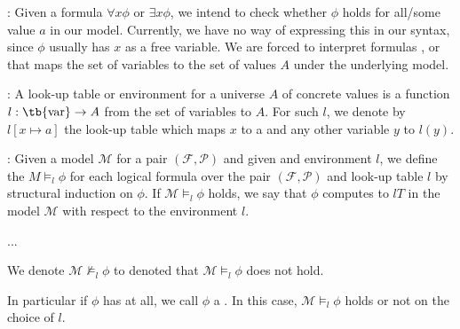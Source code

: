     \par {}: Given a formula $\forall x \phi$ or $\exists x \phi$, we intend to check whether $\phi$ holds for all/some value $a$ in our model. Currently, we have no way of expressing this in our syntax, since $\phi$ usually has $x$ as a free variable. We are forced to interpret formulas , or  that maps the set of variables to the set of values $A$ under the underlying model.

    : A look-up table or environment for a universe $A$ of concrete values is a function $l: \text{\tb{var}} \to A$ from the set of variables  to $A$. For such $l$, we denote by $l[x \mapsto a]$ the look-up table which maps $x$ to a and any other variable $y$ to $l(y)$.

    : Given a model $\mathcal{M}$ for a pair $(\mathcal{F}, \mathcal{P})$ and given and environment $l$, we define the  $M \models_{l} \phi$ for each logical formula over the pair $(\mathcal{F}, \mathcal{P})$ and look-up table $l$ by structural induction on $\phi$. If $\mathcal{M} \models_{l} \phi$ holds, we say that $\phi$ computes to $lT$ in the model $\mathcal{M}$ with respect to the environment $l$.
    \par ...
    \par We denote $\mathcal{M} \not \models_{l} \phi$ to denoted that $\mathcal{M} \models_{l} \phi$ does not hold.

    \par In particular if $\phi$ has  at all, we call $\phi$ a . In this case, $\mathcal{M} \models_{l} \phi$ holds or not  on the choice of $l$.

    